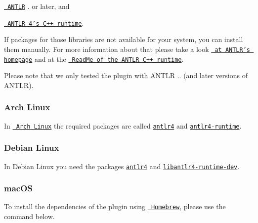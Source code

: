 \begin{DoxyItemize}
\item \href{https://www.antlr.org}{\texttt{ A\+N\+T\+LR}} {.} or later, and
\item \href{https://github.com/antlr/antlr4/tree/master/runtime/Cpp}{\texttt{ A\+N\+T\+LR 4’s C++ runtime}}.
\end{DoxyItemize}

If packages for those libraries are not available for your system, you can install them manually. For more information about that please take a look \href{https://www.antlr.org}{\texttt{ at A\+N\+T\+L\+R’s homepage}} and at the \href{https://github.com/antlr/antlr4/tree/master/runtime/Cpp}{\texttt{ Read\+Me of the A\+N\+T\+LR C++ runtime}}.

Please note that we only tested the plugin with A\+N\+T\+LR {..} (and later versions of A\+N\+T\+LR).\hypertarget{autotoc_md861_autotoc_md864}{}\subsubsection{Arch Linux}\label{autotoc_md861_autotoc_md864}
In \href{https://www.archlinux.org}{\texttt{ Arch Linux}} the required packages are called \href{https://www.archlinux.org/packages/extra/any/antlr4}{\texttt{ {\ttfamily antlr4}}} and \href{https://www.archlinux.org/packages/community/x86_64/antlr4-runtime}{\texttt{ {\ttfamily antlr4-\/runtime}}}.


\begin{DoxyCode}{0}
\end{DoxyCode}
\hypertarget{autotoc_md861_autotoc_md865}{}\subsubsection{Debian Linux}\label{autotoc_md861_autotoc_md865}
In Debian Linux you need the packages \href{https://packages.debian.org/sid/antlr4}{\texttt{ {\ttfamily antlr4}}} and \href{https://packages.debian.org/sid/libantlr4-runtime-dev}{\texttt{ {\ttfamily libantlr4-\/runtime-\/dev}}}.


\begin{DoxyCode}{0}
\end{DoxyCode}
\hypertarget{autotoc_md861_autotoc_md866}{}\subsubsection{mac\+OS}\label{autotoc_md861_autotoc_md866}
To install the dependencies of the plugin using \href{https://brew.sh}{\texttt{ Homebrew}}, please use the command below.


